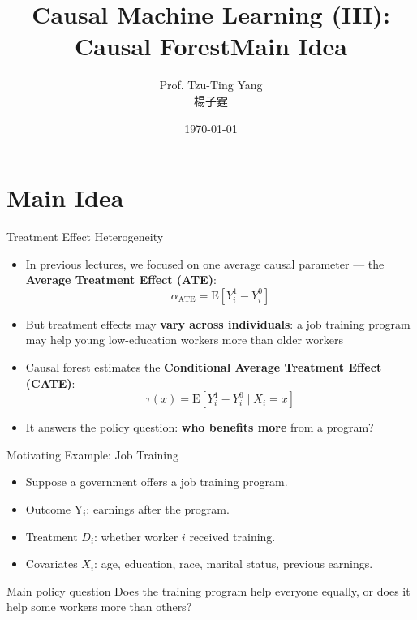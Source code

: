\documentclass[hyperref={pdfpagelabels=false}]{beamer}
\title[Causal Forest]{Causal Machine Learning (III): Causal Forest}
\author 
{Prof. Tzu-Ting Yang  \\ 楊子霆}
\institute{Institute of Economics, Academia Sinica  \\ 中央研究院經濟研究所}
\date
{\today}
\begin{document}
\begin{frame}
  \titlepage
\end{frame}

\title[]
{Main Idea}

\subtitle{}
\author{}
\institute{}
\date{}

\begin{frame}{}
  \titlepage
\end{frame}

\section{Main Idea}

\begin{frame}{Treatment Effect Heterogeneity}{}
\begin{itemize}
  \item In previous lectures, we focused on one average causal parameter --- the \textbf{Average Treatment Effect (ATE)}:
  \[
    \alpha_{\text{ATE}} = \mathrm{E}\!\left[Y_i^1 - Y_i^0\right]
  \]
  \vspace{0.2cm}
  \item But treatment effects may \textbf{vary across individuals}: a job training program may help young low-education workers more than older workers
  \vspace{0.2cm}
  \item Causal forest estimates the \textbf{Conditional Average Treatment Effect (CATE)}:
  \[
    \tau(x) = \mathrm{E}\!\left[Y_i^1 - Y_i^0 \mid X_i = x\right]
  \]
  \vspace{0.2cm}
  \item It answers the policy question: \textbf{who benefits more} from a program?
\end{itemize}
\end{frame}


\begin{frame}{Motivating Example: Job Training}
\begin{itemize}
  \item Suppose a government offers a job training program.
  \vspace{0.2cm}
  \item Outcome $\mathrm{Y}_i$: earnings after the program.
  \vspace{0.2cm}
  \item Treatment $D_i$: whether worker $i$ received training.
  \vspace{0.2cm}
  \item Covariates $X_i$: age, education, race, marital status, previous earnings.
\end{itemize}

\vspace{0.35cm}
\begin{block}{Main policy question}
  Does the training program help everyone equally, or does it help some workers more than others?
\end{block}
\end{frame}
\end{document}
